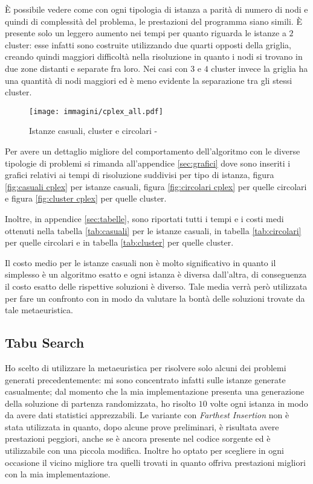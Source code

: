È possibile vedere come con ogni tipologia di istanza a parità di numero di nodi e quindi di complessità del problema, le prestazioni del programma siano simili.
È presente solo un leggero aumento nei tempi per quanto riguarda le istanze a $2$ cluster: esse infatti sono costruite utilizzando due quarti opposti della griglia, creando quindi maggiori difficoltà nella risoluzione in quanto i nodi si trovano in due zone distanti e separate fra loro.
Nei casi con $3$ e $4$ cluster invece la griglia ha una quantità di nodi maggiori ed è meno evidente la separazione tra gli stessi cluster.

\begin{figure}[htb]
	\centering
	\texttt{[image: immagini/cplex\_all.pdf]}
	\caption{Istanze casuali, cluster e circolari - }
	\label{fig:all cplex}
\end{figure}

Per avere un dettaglio migliore del comportamento dell'algoritmo con le diverse tipologie di problemi si rimanda all'appendice \ref{sec:grafici} dove sono inseriti i grafici relativi ai tempi di risoluzione suddivisi per tipo di istanza, figura \ref{fig:casuali cplex} per istanze casuali, figura \ref{fig:circolari cplex} per quelle circolari e figura \ref{fig:cluster cplex} per quelle cluster.

Inoltre, in appendice \ref{sec:tabelle}, sono riportati tutti i tempi e i costi medi ottenuti nella tabella \ref{tab:casuali} per le istanze casuali, in tabella \ref{tab:circolari} per quelle circolari e in tabella \ref{tab:cluster} per quelle cluster.

Il costo medio per le istanze casuali non è molto significativo in quanto il simplesso è un algoritmo esatto e ogni istanza è diversa dall'altra, di conseguenza il costo esatto delle rispettive soluzioni è diverso.
Tale media verrà però utilizzata per fare un confronto con \tabu in modo da valutare la bontà delle soluzioni trovate da tale metaeuristica.


\subsection{Tabu Search}

Ho scelto di utilizzare la metaeuristica \tabu per risolvere solo alcuni dei problemi generati precedentemente: mi sono concentrato infatti sulle istanze generate casualmente; dal momento che la mia implementazione presenta una generazione della soluzione di partenza randomizzata, ho risolto $10$ volte ogni istanza in modo da avere dati statistici apprezzabili.
Le variante con \emph{Farthest Insertion} non è stata utilizzata in quanto, dopo alcune prove preliminari, è risultata avere prestazioni peggiori, anche se è ancora presente nel codice sorgente ed è utilizzabile con una piccola modifica.
Inoltre ho optato per scegliere in ogni occasione il vicino migliore tra quelli trovati in quanto offriva prestazioni migliori con la mia implementazione.

